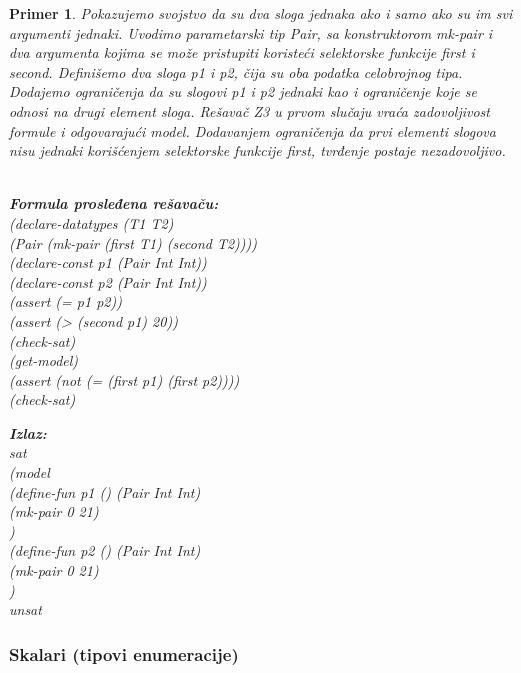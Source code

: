 \documentclass[12pt,oneside]{memoir}
\newcommand\tab[1][0.5cm]{\hspace*{#1}}
\newtheorem{primer}{Primer}
\begin{document}
\begin{primer} Pokazujemo svojstvo da su dva sloga jednaka ako i samo ako su im svi argumenti jednaki. Uvodimo parametarski tip Pair, sa konstruktorom mk-pair i dva argumenta kojima se može pristupiti koristeći selektorske funkcije first i second. Definišemo dva sloga p1 i p2, čija su oba podatka celobrojnog tipa. Dodajemo ograničenja da su slogovi p1 i p2 jednaki kao i ograničenje koje se odnosi na drugi element sloga. Rešavač Z3 u prvom slučaju vraća zadovoljivost formule i odgovarajući model. Dodavanjem ograničenja da prvi elementi slogova nisu jednaki korišćenjem selektorske funkcije first, tvrđenje postaje nezadovoljivo.
\\ \\
\begin{minipage}[b]{0.5\textwidth}
\textbf{Formula prosleđena rešavaču:}
\\(declare-datatypes (T1 T2) 
\\\tab[0.3cm](Pair (mk-pair (first T1) (second T2))))
\\(declare-const p1 (Pair Int Int))
\\(declare-const p2 (Pair Int Int))
\\(assert (= p1 p2))
\\(assert (> (second p1) 20))
\\(check-sat)
\\(get-model)
\\(assert (not (= (first p1) (first p2))))
\\(check-sat)
\end{minipage}
\hspace{1.5cm} 
\begin{minipage}[t]{0.5\textwidth}
\vspace{-6.59cm}
\textbf{Izlaz:}
\\sat 
\\(model 
\\\tab(define-fun p1 () (Pair Int Int) 
\\\tab\tab(mk-pair 0 21)
\\\tab) 
\\\tab(define-fun p2 () (Pair Int Int) 
\\\tab\tab(mk-pair 0 21)
\\\tab)
\\unsat
\end{minipage}

\end{primer}
\subsubsection{Skalari (tipovi enumeracije)}
\end{document}
